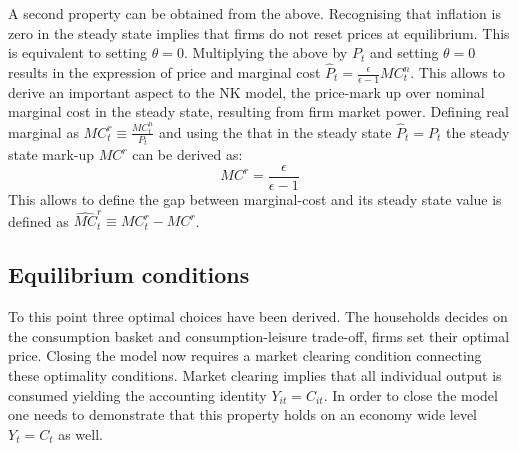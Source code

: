 \documentclass[12pt,a4paper,english]{article} %
\begin{document}
	A second property can be obtained from the above. Recognising that inflation is zero in the steady state implies that firms do not reset prices at equilibrium. This is equivalent to setting $\theta=0$. Multiplying the above by $P_t$ and setting $\theta=0$ results in the expression of price and marginal cost $\hat{P}_t = \frac{\epsilon}{\epsilon-1} MC_t^n$. This allows to derive an important aspect to the NK model, the price-mark up over nominal marginal cost in the steady state, resulting from firm market power. Defining real marginal as $MC_t^r \equiv \frac{MC_t^n}{P_t}$ and using the that in the steady state $\hat{P}_t = P_t$ the steady state mark-up $MC^r$ can be derived as:	
	\begin{equation} \label{eq:nk_mark-up}
		MC^r = \frac{\epsilon}{\epsilon-1}
	\end{equation} 
	This allows to define the gap between marginal-cost and its steady state value is defined as $\hat{MC}_t^r \equiv MC_t^r - MC^r$.
	
	\subsection{Equilibrium conditions}  \label{nk_eqili}
	To this point three optimal choices have been derived. The households decides on the consumption basket and consumption-leisure trade-off, firms set their optimal price. Closing the model now requires a market clearing condition connecting these optimality conditions. Market clearing implies that all individual output is consumed yielding the accounting identity $Y_{it} = C_{it}$. In order to close the model one needs to demonstrate that this property holds on an economy wide level $Y_t = C_t$ as well.
	
\end{document}

